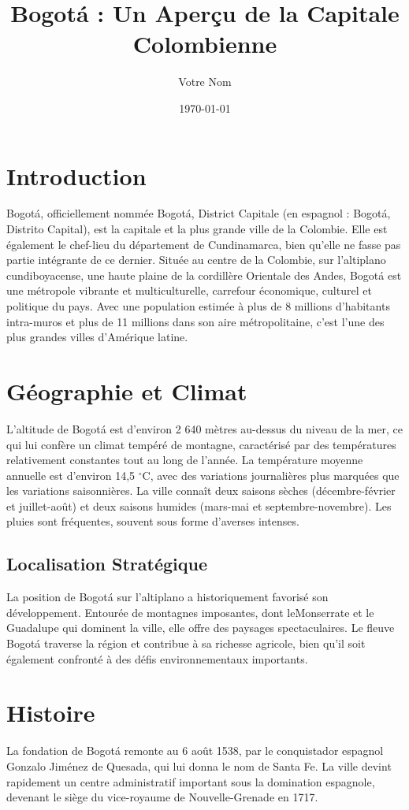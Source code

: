 \documentclass{article}
\title{Bogotá : Un Aperçu de la Capitale Colombienne}
\author{Votre Nom}
\date{\today}
\begin{document}
\maketitle

\section{Introduction}
Bogotá, officiellement nommée Bogotá, District Capitale (en espagnol : Bogotá, Distrito Capital), est la capitale et la plus grande ville de la Colombie. Elle est également le chef-lieu du département de Cundinamarca, bien qu'elle ne fasse pas partie intégrante de ce dernier. Située au centre de la Colombie, sur l'altiplano cundiboyacense, une haute plaine de la cordillère Orientale des Andes, Bogotá est une métropole vibrante et multiculturelle, carrefour économique, culturel et politique du pays. Avec une population estimée à plus de 8 millions d'habitants intra-muros et plus de 11 millions dans son aire métropolitaine, c'est l'une des plus grandes villes d'Amérique latine.

\section{Géographie et Climat}
L'altitude de Bogotá est d'environ 2 640 mètres au-dessus du niveau de la mer, ce qui lui confère un climat tempéré de montagne, caractérisé par des températures relativement constantes tout au long de l'année. La température moyenne annuelle est d'environ 14,5 $^\circ$C, avec des variations journalières plus marquées que les variations saisonnières. La ville connaît deux saisons sèches (décembre-février et juillet-août) et deux saisons humides (mars-mai et septembre-novembre). Les pluies sont fréquentes, souvent sous forme d'averses intenses.

\subsection{Localisation Stratégique}
La position de Bogotá sur l'altiplano a historiquement favorisé son développement. Entourée de montagnes imposantes, dont leMonserrate et le Guadalupe qui dominent la ville, elle offre des paysages spectaculaires. Le fleuve Bogotá traverse la région et contribue à sa richesse agricole, bien qu'il soit également confronté à des défis environnementaux importants.

\section{Histoire}
La fondation de Bogotá remonte au 6 août 1538, par le conquistador espagnol Gonzalo Jiménez de Quesada, qui lui donna le nom de Santa Fe. La ville devint rapidement un centre administratif important sous la domination espagnole, devenant le siège du vice-royaume de Nouvelle-Grenade en 1717.
\end{document}
